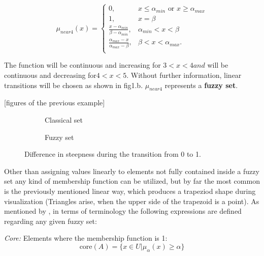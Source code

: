 \[
	\mu_{near 4}(x) =
		\begin{cases}
			0, &x \leq \alpha_{min} \text{ or } x \geq \alpha_{max}\\
			1, &x = \beta\\
			\frac{x - \alpha_{min}}{\beta - \alpha_{min}}, &\alpha_{min} < x < \beta\\
			\frac{\alpha_{max} - x}{\alpha_{max} - \beta}, &\beta < x < \alpha_{max}.\\
		\end{cases}
\]

The function will be continuous and increasing for $3 < x < 4 and$ will be continuous and decreasing for$ 4 < x < 5$. Without further information, linear transitions will be chosen as shown in fig1.b. $\mu_{near 4} $ represents a \textbf{fuzzy set}.

[figures of the previous example]
\begin{figure}[!h]
\centering
\begin{subfigure}{.5\textwidth}
	\centering
  	\caption{Classical set}
  	\label{fig:sub1}
\end{subfigure}%
\begin{subfigure}{.5\textwidth}
	\centering
  	\caption{Fuzzy set}
  	\label{fig:sub2}
\end{subfigure}
\caption{Difference in steepness during the transition from 0 to 1.}
\label{fig:steepness}
\end{figure}

Other than assigning values linearly to elements not fully contained inside a fuzzy set any kind of membership function can be utilized, but by far the most common is the previously mentioned linear way, which produces a trapeziod shape during visualization (Triangles arise, when the upper side of the trapezoid is a point). As mentioned by \cite{sabri2013}, in terms of terminology the following expressions are defined regarding any given fuzzy set:

\textit{Core:} Elements where the membership function is 1:
\[
	\text{core}(A) = \{x \in U \vert \mu_{\alpha}(x) \geq \alpha\}
\]

